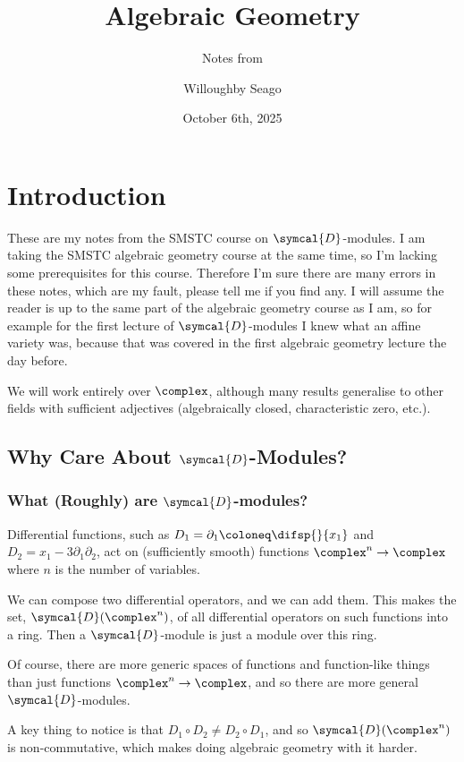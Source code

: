 \documentclass[fleqn]{NotesClass}
\title{Algebraic Geometry}
\author{Willoughby Seago}
\date{October 6th, 2025}
\subtitle{Notes from}
\newcommand{\D}{\symcal{D}}
\begin{document}
    \frontmatter
    \titlepage
    \innertitlepage{}
    \tableofcontents
    \mainmatter
    
    \chapter{Introduction}
    These are my notes from the SMSTC course on \(\D\)-modules.
    I am taking the SMSTC algebraic geometry course at the same time, so I'm lacking some prerequisites for this course.
    Therefore I'm sure there are many errors in these notes, which are my fault, please tell me if you find any.
    I will assume the reader is up to the same part of the algebraic geometry course as I am, so for example for the first lecture of \(\D\)-modules I knew what an affine variety was, because that was covered in the first algebraic geometry lecture the day before.
    
    We will work entirely over \(\complex\), although many results generalise to other fields with sufficient adjectives (algebraically closed, characteristic zero, etc.).
    
    \section{Why Care About \texorpdfstring{\(\D\)}{D}-Modules?}
    \subsection{What (Roughly) are \texorpdfstring{\(\D\)}{D}-modules?}
    Differential functions, such as \(D_1 = \partial_1 \coloneq \difsp{}{x_1}\) and \(D_2 = x_1 - 3\partial_1\partial_2\), act on (sufficiently smooth) functions \(\complex^n \to \complex\) where \(n\) is the number of variables.
    
    We can compose two differential operators, and we can add them.
    This makes the set, \(\D(\complex^n)\), of all differential operators on such functions into a ring.
    Then a \(\D\)-module is just a module over this ring.
    
    Of course, there are more generic spaces of functions and function-like things than just functions \(\complex^n \to \complex\), and so there are more general \(\D\)-modules.
    
    A key thing to notice is that \(D_1 \circ D_2 \ne D_2 \circ D_1\), and so \(\D(\complex^n)\) is non-commutative, which makes doing algebraic geometry with it harder.
    
\end{document}

